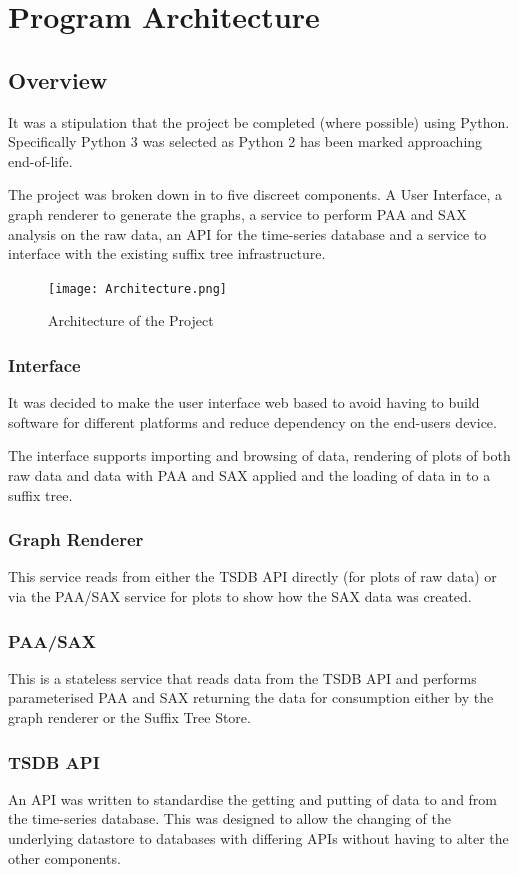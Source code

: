 \documentclass[11pt, a4paper]{scrartcl}
\begin{document}
	\section{Program Architecture}
	\subsection{Overview}
	It was a stipulation that the project be completed (where possible) using Python.  Specifically Python 3 was selected as Python 2 has been marked approaching end-of-life.
	
	The project was broken down in to five discreet components.  A User Interface, a graph renderer to generate the graphs, a service to perform PAA and SAX analysis on the raw data, an API for the time-series database and a service to interface with the existing suffix tree infrastructure.
	
	\begin{figure}[h]
		\centering
		\texttt{[image: Architecture.png]}
		\caption{Architecture of the Project}
	\end{figure}
	
	\subsubsection{Interface}
	It was decided to make the user interface web based to avoid having to build software for different platforms and reduce dependency on the end-users device.
	
	The interface supports importing and browsing of data, rendering of plots of both raw data and data with PAA and SAX applied and the loading of data in to a suffix tree.
	
	\subsubsection{Graph Renderer}
	This service reads from either the TSDB API directly (for plots of raw data) or via the PAA/SAX service for plots to show how the SAX data was created.
	
	\subsubsection{PAA/SAX}
	This is a stateless service that reads data from the TSDB API and performs parameterised PAA and SAX returning the data for consumption either by the graph renderer or the Suffix Tree Store.
	
	\subsubsection{TSDB API}
	An API was written to standardise the getting and putting of data to and from the time-series database.  This was designed to allow the changing of the underlying datastore to databases with differing APIs without having to alter the other components.
	
\end{document}
